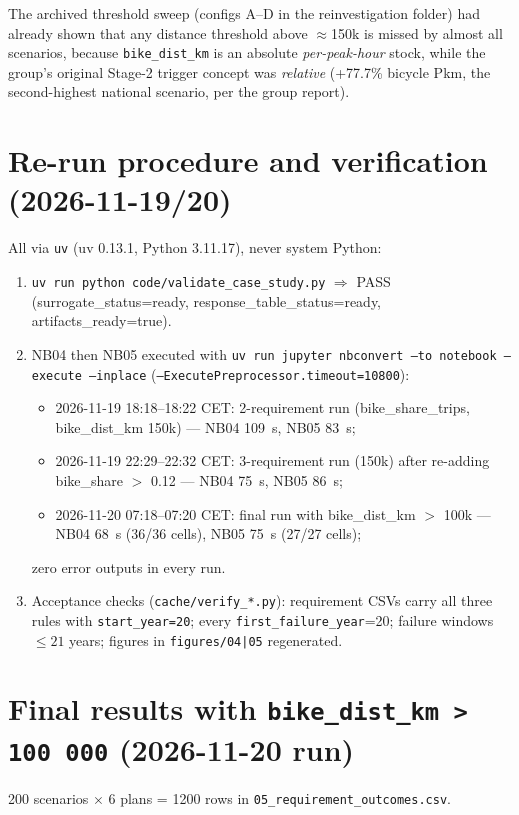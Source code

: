 \documentclass[11pt,a4paper]{article}
\begin{document}
The archived threshold sweep (configs A--D in the reinvestigation folder) had already
shown that any distance threshold above $\approx$150k is missed by almost all scenarios,
because \texttt{bike\_dist\_km} is an absolute \emph{per-peak-hour} stock, while the
group's original Stage-2 trigger concept was \emph{relative} (+77.7\% bicycle Pkm,
the second-highest national scenario, per the group report).

\section{Re-run procedure and verification (2026-11-19/20)}
All via \texttt{uv} (uv 0.13.1, Python 3.11.17), never system Python:
\begin{enumerate}
  \item \texttt{uv run python code/validate\_case\_study.py} $\Rightarrow$ PASS
        (surrogate\_status=ready, response\_table\_status=ready, artifacts\_ready=true).
  \item NB04 then NB05 executed with
        \texttt{uv run jupyter nbconvert --to notebook --execute --inplace}
        (\texttt{--ExecutePreprocessor.timeout=10800}):
        \begin{itemize}
          \item 2026-11-19 18:18--18:22 CET: 2-requirement run (bike\_share\_trips, bike\_dist\_km 150k) --- NB04 109~s, NB05 83~s;
          \item 2026-11-19 22:29--22:32 CET: 3-requirement run (150k) after re-adding bike\_share $>$ 0.12 --- NB04 75~s, NB05 86~s;
          \item 2026-11-20 07:18--07:20 CET: final run with bike\_dist\_km $>$ 100k --- NB04 68~s (36/36 cells), NB05 75~s (27/27 cells);
        \end{itemize}
        zero error outputs in every run.
  \item Acceptance checks (\texttt{cache/verify\_*.py}): requirement CSVs carry all
        three rules with \texttt{start\_year=20}; every \texttt{first\_failure\_year}=20;
        failure windows $\leq 21$ years; figures in \texttt{figures/04|05} regenerated.
\end{enumerate}

\section{Final results with \texttt{bike\_dist\_km > 100\,000} (2026-11-20 run)}
200 scenarios $\times$ 6 plans = 1200 rows in \texttt{05\_requirement\_outcomes.csv}.
\end{document}
